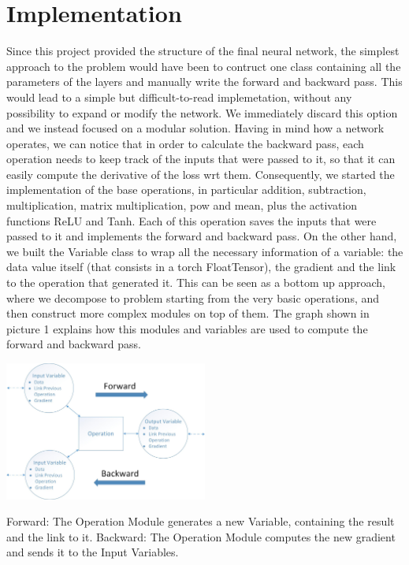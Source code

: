\documentclass[10pt,conference,compsocconf]{IEEEtran}
\begin{document}
        
\section{Implementation}
	Since this project provided the structure of the final neural network, the simplest approach to the problem would have been to contruct one class containing all the parameters of the layers and manually write the forward and backward pass. This would lead to a simple but difficult-to-read implemetation, without any possibility to expand or modify the network. We immediately discard this option and we instead focused on a modular solution.
	Having in mind how a network operates, we can notice that in order to calculate the backward pass, each operation needs to keep track of the inputs that were passed to it, so that it can easily compute the derivative of the loss wrt them. Consequently, we started the implementation of the base operations, in particular addition, subtraction, multiplication, matrix multiplication, pow and mean, plus the activation functions ReLU and Tanh. Each of this operation saves the inputs that were passed to it and implements the forward and backward pass. On the other hand, we built the Variable class to wrap all the necessary information of a variable: the data value itself (that consists in a torch FloatTensor), the gradient and the link to the operation that generated it. This can be seen as a bottom up approach, where we decompose to problem starting from the very basic operations, and then construct more complex modules on top of them. The graph shown in picture 1 explains how this modules and variables are used to compute the forward and backward pass.

	\begin{center}
		\captionsetup{type=figure}
		\includegraphics[width=0.5\textwidth]{img/ForwardBackward.jpg}
		\label{fig:ForwardBackward}
		\caption {Forward: The Operation Module generates a new Variable, containing the result and the link to it. Backward: The Operation Module computes the new gradient and sends it to the Input Variables.}
	\end{center}
\end{document}
